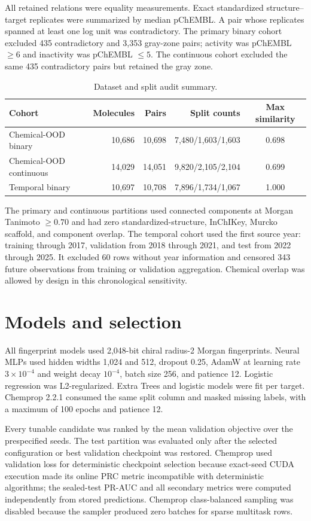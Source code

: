 \documentclass[11pt]{article}
\begin{document}
All retained relations were equality measurements. Exact standardized
structure--target replicates were summarized by median pChEMBL. A pair whose
replicates spanned at least one log unit was contradictory. The primary binary
cohort excluded 435 contradictory and 3,353 gray-zone pairs; activity was
pChEMBL $\geq 6$ and inactivity was pChEMBL $\leq 5$. The continuous cohort
excluded the same 435 contradictory pairs but retained the gray zone.

\begin{table}[ht]
\centering
\small
\caption{Dataset and split audit summary.}
\begin{tabular}{lrrrc}
\toprule
Cohort & Molecules & Pairs & Split counts & Max similarity\\
\midrule
Chemical-OOD binary & 10,686 & 10,698 & 7,480/1,603/1,603 & 0.698\\
Chemical-OOD continuous & 14,029 & 14,051 & 9,820/2,105/2,104 & 0.699\\
Temporal binary & 10,697 & 10,708 & 7,896/1,734/1,067 & 1.000\\
\bottomrule
\end{tabular}
\end{table}

The primary and continuous partitions used connected components at Morgan
Tanimoto $\geq0.70$ and had zero standardized-structure, InChIKey, Murcko
scaffold, and component overlap. The temporal cohort used the first source year:
training through 2017, validation from 2018 through 2021, and test from 2022
through 2025. It excluded 60 rows without year information and censored 343
future observations from training or validation aggregation. Chemical overlap
was allowed by design in this chronological sensitivity.

\section{Models and selection}

All fingerprint models used 2,048-bit chiral radius-2 Morgan fingerprints.
Neural MLPs used hidden widths 1,024 and 512, dropout 0.25, AdamW at learning
rate $3\times10^{-4}$ and weight decay $10^{-4}$, batch size 256, and patience
12. Logistic regression was L2-regularized. Extra Trees and logistic models were
fit per target. Chemprop 2.2.1 consumed the same split column and masked missing
labels, with a maximum of 100 epochs and patience 12.

Every tunable candidate was ranked by the mean validation objective over the
prespecified seeds. The test partition was evaluated only after the selected
configuration or best validation checkpoint was restored. Chemprop used
validation loss for deterministic checkpoint selection because exact-seed CUDA
execution made its online PRC metric incompatible with deterministic algorithms;
the sealed-test PR-AUC and all secondary metrics were computed independently
from stored predictions. Chemprop class-balanced sampling was disabled because
the sampler produced zero batches for sparse multitask rows.
\end{document}
